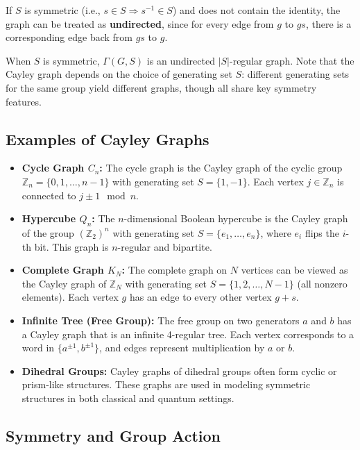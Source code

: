 \documentclass[12pt]{report}
\begin{document}
If $S$ is symmetric (i.e., $s \in S \Rightarrow s^{-1} \in S$) and does not contain the identity, the graph can be treated as \textbf{undirected}, since for every edge from $g$ to $gs$, there is a corresponding edge back from $gs$ to $g$.

When $S$ is symmetric, $\Gamma(G, S)$ is an undirected $|S|$-regular graph. Note that the Cayley graph depends on the choice of generating set $S$: different generating sets for the same group yield different graphs, though all share key symmetry features.

\subsection{Examples of Cayley Graphs}

\begin{itemize}
    \item \textbf{Cycle Graph $C_n$:} The cycle graph is the Cayley graph of the cyclic group $\mathbb{Z}_n = \{0, 1, \dots, n-1\}$ with generating set $S = \{1, -1\}$. Each vertex $j \in \mathbb{Z}_n$ is connected to $j \pm 1 \mod n$.

    \item \textbf{Hypercube $Q_n$:} The $n$-dimensional Boolean hypercube is the Cayley graph of the group $(\mathbb{Z}_2)^n$ with generating set $S = \{e_1, \dots, e_n\}$, where $e_i$ flips the $i$-th bit. This graph is $n$-regular and bipartite.

    \item \textbf{Complete Graph $K_N$:} The complete graph on $N$ vertices can be viewed as the Cayley graph of $\mathbb{Z}_N$ with generating set $S = \{1, 2, \dots, N-1\}$ (all nonzero elements). Each vertex $g$ has an edge to every other vertex $g+s$.

    \item \textbf{Infinite Tree (Free Group):} The free group on two generators $a$ and $b$ has a Cayley graph that is an infinite 4-regular tree. Each vertex corresponds to a word in $\{a^{\pm1}, b^{\pm1}\}$, and edges represent multiplication by $a$ or $b$.

    \item \textbf{Dihedral Groups:} Cayley graphs of dihedral groups often form cyclic or prism-like structures. These graphs are used in modeling symmetric structures in both classical and quantum settings.
\end{itemize}

\subsection{Symmetry and Group Action}
\end{document}
